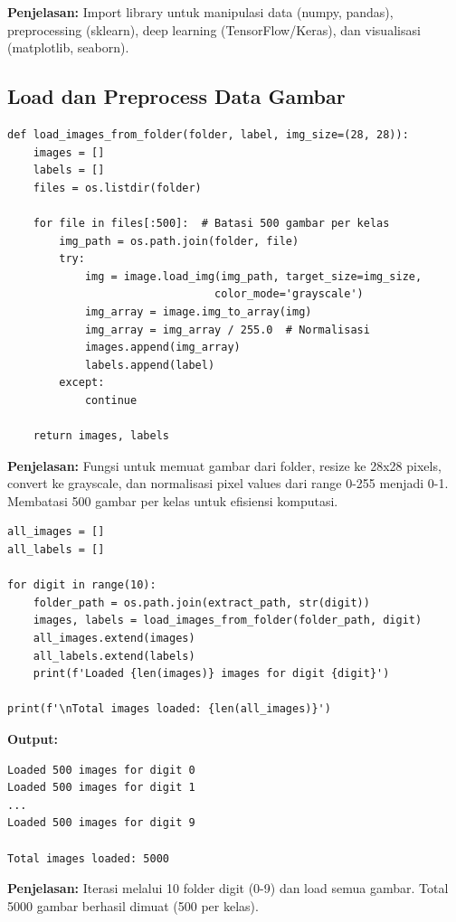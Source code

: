 \documentclass[12pt,a4paper]{article}
\begin{document}
\textbf{Penjelasan:} Import library untuk manipulasi data (numpy, pandas), preprocessing (sklearn), deep learning (TensorFlow/Keras), dan visualisasi (matplotlib, seaborn).

\subsection{Load dan Preprocess Data Gambar}

\begin{lstlisting}[caption=Fungsi Load Images]
def load_images_from_folder(folder, label, img_size=(28, 28)):
    images = []
    labels = []
    files = os.listdir(folder)
    
    for file in files[:500]:  # Batasi 500 gambar per kelas
        img_path = os.path.join(folder, file)
        try:
            img = image.load_img(img_path, target_size=img_size, 
                                color_mode='grayscale')
            img_array = image.img_to_array(img)
            img_array = img_array / 255.0  # Normalisasi
            images.append(img_array)
            labels.append(label)
        except:
            continue
    
    return images, labels
\end{lstlisting}

\textbf{Penjelasan:} Fungsi untuk memuat gambar dari folder, resize ke 28x28 pixels, convert ke grayscale, dan normalisasi pixel values dari range 0-255 menjadi 0-1. Membatasi 500 gambar per kelas untuk efisiensi komputasi.

\begin{lstlisting}[caption=Load Semua Data]
all_images = []
all_labels = []

for digit in range(10):
    folder_path = os.path.join(extract_path, str(digit))
    images, labels = load_images_from_folder(folder_path, digit)
    all_images.extend(images)
    all_labels.extend(labels)
    print(f'Loaded {len(images)} images for digit {digit}')

print(f'\nTotal images loaded: {len(all_images)}')
\end{lstlisting}

\textbf{Output:}
\begin{verbatim}
Loaded 500 images for digit 0
Loaded 500 images for digit 1
...
Loaded 500 images for digit 9

Total images loaded: 5000
\end{verbatim}

\textbf{Penjelasan:} Iterasi melalui 10 folder digit (0-9) dan load semua gambar. Total 5000 gambar berhasil dimuat (500 per kelas).
\end{document}
